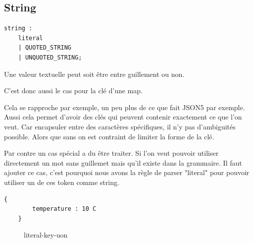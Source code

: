 \documentclass[
    iict, %
    il, %
]{heig-tb}
\begin{document}
\subsection{String}

\begin{lstlisting}[frame=single,caption={uon-string},label={uon-string}]
    string :
	literal
	| QUOTED_STRING
	| UNQUOTED_STRING;
\end{lstlisting}

Une valeur textuelle peut soit être entre guillement ou non.

C'est donc aussi le cas pour la clé d'une map.

Cela se rapproche par exemple, un peu plus de ce que fait JSON5 par exemple. %
Aussi cela permet d'avoir des clés qui peuvent contenir exactement ce que l'on veut.
Car encapsuler entre des caractères spécifiques, il n'y pas d'ambiguités possible. Alors que sans on est contraint de limiter la forme de la clé.

Par contre un cas spécial a du être traiter. Si l'on veut pouvoir utiliser directement un mot sans guillemet mais qu'il existe dans la grammaire.
Il faut ajouter ce cas, c'est pourquoi nous avons la règle de parser "literal" pour pouvoir utiliser un de ces token comme string.

\begin{lstlisting}[frame=single]
    {
        temperature : 10 C
    }
\end{lstlisting}

\begin{figure}[!h]
    \begin{center}
    \end{center}
    \caption[literal-key-uon]{\label{literal-key-uon}literal-key-uon}
\end{figure}
\end{document}

